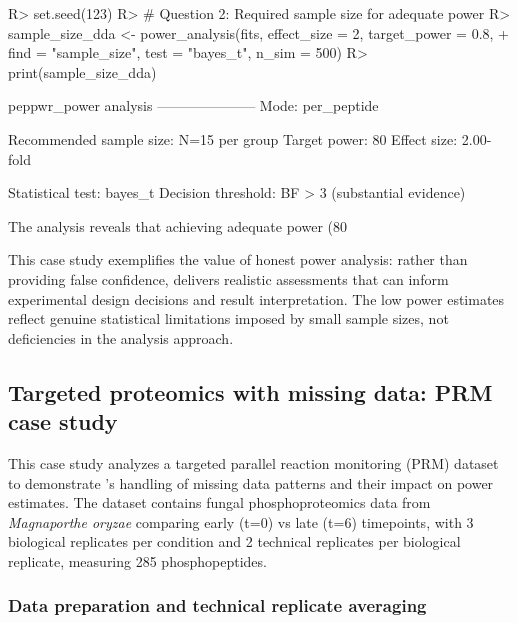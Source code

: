 \documentclass[article]{jss}
\begin{document}
\begin{Schunk}
\begin{Sinput}
R> set.seed(123)
R> # Question 2: Required sample size for adequate power
R> sample_size_dda <- power_analysis(fits, effect_size = 2, target_power = 0.8,
+                                    find = "sample_size", test = "bayes_t", n_sim = 500)
R> print(sample_size_dda)
\end{Sinput}
\begin{Soutput}
peppwr_power analysis
---------------------
Mode: per_peptide

Recommended sample size: N=15 per group
Target power: 80%
Effect size: 2.00-fold

Statistical test: bayes_t
Decision threshold: BF > 3 (substantial evidence)
\end{Soutput}
\end{Schunk}

The analysis reveals that achieving adequate power (80%

This case study exemplifies the value of honest power analysis: rather than providing false confidence,  delivers realistic assessments that can inform experimental design decisions and result interpretation. The low power estimates reflect genuine statistical limitations imposed by small sample sizes, not deficiencies in the analysis approach.

\subsection{Targeted proteomics with missing data: PRM case study}

This case study analyzes a targeted parallel reaction monitoring (PRM) dataset to demonstrate 's handling of missing data patterns and their impact on power estimates. The dataset contains fungal phosphoproteomics data from \emph{Magnaporthe oryzae} comparing early (t=0) vs late (t=6) timepoints, with 3 biological replicates per condition and 2 technical replicates per biological replicate, measuring 285 phosphopeptides.

\subsubsection{Data preparation and technical replicate averaging}
\end{document}
